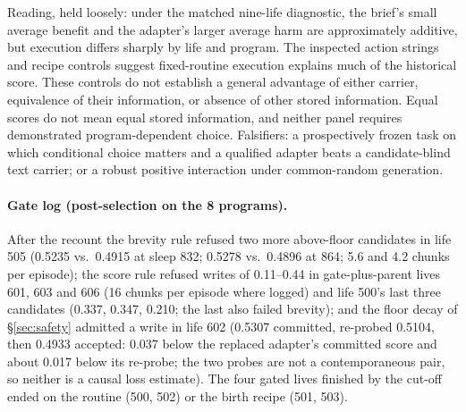 \documentclass{article}
\begin{document}
Reading, held loosely: under the matched nine-life diagnostic, the brief's small average benefit and the adapter's larger average harm are approximately additive, but execution differs sharply by life and program. The inspected action strings and recipe controls suggest fixed-routine execution explains much of the historical score. These controls do not establish a general advantage of either carrier, equivalence of their information, or absence of other stored information. Equal scores do not mean equal stored information, and neither panel requires demonstrated program-dependent choice. Falsifiers: a prospectively frozen task on which conditional choice matters and a qualified adapter beats a candidate-blind text carrier; or a robust positive interaction under common-random generation.

\paragraph{Gate log (post-selection on the 8 programs).} After the recount the brevity rule refused two more above-floor candidates in life 505 (0.5235 vs.\ 0.4915 at sleep 832; 0.5278 vs.\ 0.4896 at 864; 5.6 and 4.2 chunks per episode); the score rule refused writes of 0.11--0.44 in gate-plus-parent lives 601, 603 and 606 (16 chunks per episode where logged) and life 500's last three candidates (0.337, 0.347, 0.210; the last also failed brevity); and the floor decay of \S\ref{sec:safety} admitted a write in life 602 (0.5307 committed, re-probed 0.5104, then 0.4933 accepted: 0.037 below the replaced adapter's committed score and about 0.017 below its re-probe; the two probes are not a contemporaneous pair, so neither is a causal loss estimate). The four gated lives finished by the cut-off ended on the routine (500, 502) or the birth recipe (501, 503).
\end{document}
